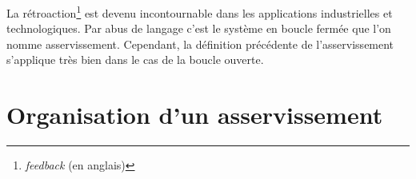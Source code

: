 La rétroaction\footnote{\emph{feedback} (en anglais)} est devenu incontournable
dans les applications industrielles et technologiques. Par abus de langage 
c'est le système en boucle fermée que l'on nomme asservissement. Cependant, la 
définition précédente de l'asservissement s'applique très bien dans 
le cas de la boucle ouverte.
\section{Organisation d'un asservissement}

